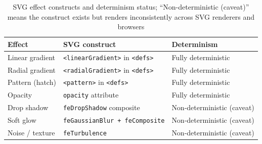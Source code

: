 \begin{table}[h]
\centering
\small
\begin{tabular}{lll}
\toprule
\textbf{Effect} & \textbf{SVG construct} & \textbf{Determinism} \\
\midrule
Linear gradient  & \texttt{<linearGradient>} in \texttt{<defs>} & Fully deterministic \\
Radial gradient  & \texttt{<radialGradient>} in \texttt{<defs>} & Fully deterministic \\
Pattern (hatch)  & \texttt{<pattern>} in \texttt{<defs>}         & Fully deterministic \\
Opacity          & \texttt{opacity} attribute                     & Fully deterministic \\
Drop shadow      & \texttt{feDropShadow} composite                & Non-deterministic (caveat) \\
Soft glow        & \texttt{feGaussianBlur + feComposite}          & Non-deterministic (caveat) \\
Noise / texture  & \texttt{feTurbulence}                          & Non-deterministic (caveat) \\
\bottomrule
\end{tabular}
\caption{SVG effect constructs and determinism status; ``Non-deterministic (caveat)'' means
  the construct exists but renders inconsistently across SVG renderers and browsers}
\label{tab:svg-safe-filters}
\end{table}

